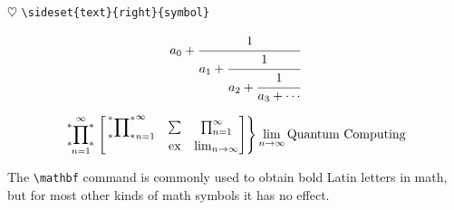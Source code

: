 \documentclass[a4paper,12pt]{amsart}
\theoremstyle{plain}
\theoremstyle{definition}
\theoremstyle{remark}
\numberwithin{equation}{section} %
\DeclareMathOperator{\ex}{ex}
\begin{document}
$\heartsuit$ \verb|\sideset{text}{right}{symbol}|

\[
	a_0+\cfrac{1}{a_1+\cfrac{1}{a_2+\cfrac{1}{a_3+\cdots}}}
\]

\begin{equation}
	\sideset{_\ast^\ast}{_\ast^\ast}\prod_{n=1}^{\infty} \left.	\begin{aligned}
		\begin{bmatrix}
			\sideset{_\ast^\ast}{_\ast^\ast}\prod_{n=1}^{\infty} & \sum & \prod_{n=1}^{\infty} \\
			                                                     & \ex  & \lim_{n\to \infty}
		\end{bmatrix}
	\end{aligned} \right \rbrace \lim_{n\to \infty} \text{Quantum Computing}
\end{equation}

The \verb|\mathbf| command is commonly used to obtain bold Latin letters in math, but for most other kinds of math symbols it has no effect.
\end{document}
